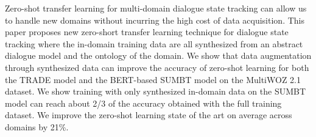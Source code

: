 Zero-shot transfer learning for multi-domain dialogue state tracking can allow us to handle new domains without incurring the high cost of data acquisition. This paper proposes new zero-short transfer learning technique for dialogue state tracking where the in-domain training data are all synthesized from an abstract dialogue model and the ontology of the domain. We show that data augmentation through synthesized data can improve the accuracy of zero-shot learning for both the TRADE model and the BERT-based SUMBT model on the MultiWOZ 2.1 dataset. We show training with only synthesized in-domain data on the SUMBT model can reach about 2/3 of the accuracy obtained with the full training dataset. We improve the zero-shot learning state of the art on average across domains by 21\%.
